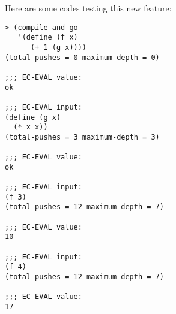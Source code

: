 \documentclass[a4paper,12pt]{article}
\begin{document}
Here are some codes testing this new feature:
\begin{lstlisting}
> (compile-and-go
   '(define (f x)
      (+ 1 (g x))))
(total-pushes = 0 maximum-depth = 0)

;;; EC-EVAL value:
ok

;;; EC-EVAL input:
(define (g x)
  (* x x))
(total-pushes = 3 maximum-depth = 3)

;;; EC-EVAL value:
ok

;;; EC-EVAL input:
(f 3)
(total-pushes = 12 maximum-depth = 7)

;;; EC-EVAL value:
10

;;; EC-EVAL input:
(f 4)
(total-pushes = 12 maximum-depth = 7)

;;; EC-EVAL value:
17
\end{lstlisting}
\end{document}
